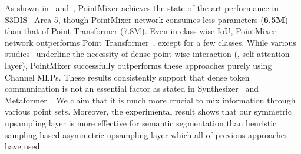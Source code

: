 As shown in~ and~, PointMixer achieves the state-of-the-art performance in \textsc{S3DIS}~\cite{armeni_cvpr16} Area 5, though PointMixer network consumes less parameters (\textbf{6.5M}) than that of Point Transformer (7.8M). Even in class-wise IoU, PointMixer network outperforms Point Transformer~\cite{point-transformer}, except for a few classes. 
While various studies~\cite{point-transformer,cloud-transformer,point-cloud-transformer} underline the necessity of dense point-wise interaction (\ie, self-attention layer), PointMixer successfully outperforms these approaches purely using Channel MLPs. These results consistently support that dense token communication is not an essential factor as stated in Synthesizer~\cite{synthesizer} and Metaformer~\cite{metaformer}. We claim that it is much more crucial to mix information through various point sets.
Moreover, the experimental result shows that our symmetric upsampling layer is more effective for semantic segmentation than heuristic sampling-based asymmetric upsampling layer which all of previous approaches~\cite{pointnet++,kpconv,point-transformer} have used.
